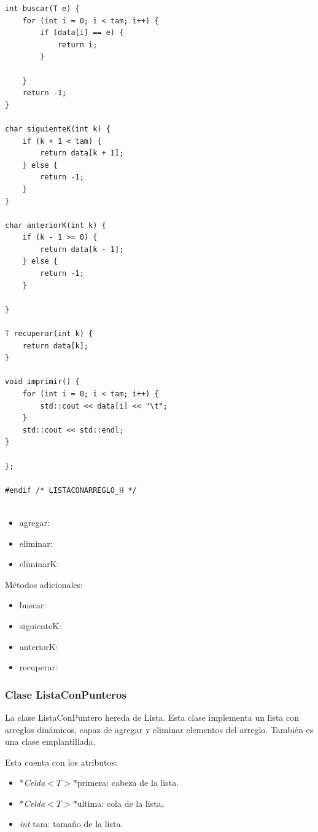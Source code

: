 \documentclass[11pt]{article}
\begin{document}
\begin{lstlisting}
int buscar(T e) {
    for (int i = 0; i < tam; i++) {
        if (data[i] == e) {
            return i;
        }

    }
    return -1;
}

char siguienteK(int k) {
    if (k + 1 < tam) {
        return data[k + 1];
    } else {
        return -1;
    }
}

char anteriorK(int k) {
    if (k - 1 >= 0) {
        return data[k - 1];
    } else {
        return -1;
    }

}

T recuperar(int k) {
    return data[k];
}

void imprimir() {
    for (int i = 0; i < tam; i++) {
        std::cout << data[i] << "\t";
    }
    std::cout << std::endl;
}

};

#endif /* LISTACONARREGLO_H */


\end{lstlisting}


\begin{itemize}
\item agregar:
\item eliminar:
\item eliminarK:
\end{itemize}

Métodos adicionales:
\begin{itemize}
\item buscar:
\item siguienteK:
\item anteriorK:
\item recuperar:
\end{itemize}

\newpage 
\subsubsection{Clase ListaConPunteros}
La clase ListaConPuntero hereda de Lista. Esta clase implementa un lista con arreglos dinámicos, capaz de agregar y eliminar elementos del arreglo. También es una clase emplantillada.

Esta cuenta con los atributos: 
\begin{itemize}
\item \textit{$*$Celda$<T>*$}primera: cabeza de la lista.
\item \textit{$*$Celda$<T>*$}ultima: cola de la lista.
\item \textit{int} tam: tamaño de la lista. 
\end{itemize}
\end{document}
